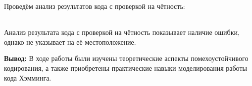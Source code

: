 \documentclass[11pt]{article}
\begin{document}
Проведём анализ результатов кода с проверкой на чётность:

\begin{table}[h]
    \end{table} \\

    
Анализ результата кода с проверкой на чётность показывает наличие ошибки, однако не указывает на её местоположение.


\textbf{Вывод:} В ходе работы были изучены теоретические аспекты помехоустойчивого кодирования, а также приобретены практические навыки моделирования работы кода Хэмминга.
\end{document}
